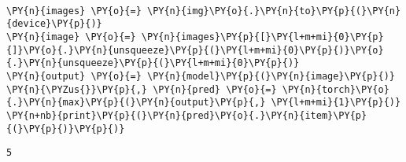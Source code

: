     \begin{center}
    \end{center}
    { \hspace*{\fill} \\}
    
    \begin{tcolorbox}[breakable, size=fbox, boxrule=1pt, pad at break*=1mm,colback=cellbackground, colframe=cellborder]
\begin{Verbatim}[commandchars=\\\{\}]
\PY{n}{images} \PY{o}{=} \PY{n}{img}\PY{o}{.}\PY{n}{to}\PY{p}{(}\PY{n}{device}\PY{p}{)}
\PY{n}{image} \PY{o}{=} \PY{n}{images}\PY{p}{[}\PY{l+m+mi}{0}\PY{p}{]}\PY{o}{.}\PY{n}{unsqueeze}\PY{p}{(}\PY{l+m+mi}{0}\PY{p}{)}\PY{o}{.}\PY{n}{unsqueeze}\PY{p}{(}\PY{l+m+mi}{0}\PY{p}{)}
\PY{n}{output} \PY{o}{=} \PY{n}{model}\PY{p}{(}\PY{n}{image}\PY{p}{)}
\PY{n}{\PYZus{}}\PY{p}{,} \PY{n}{pred} \PY{o}{=} \PY{n}{torch}\PY{o}{.}\PY{n}{max}\PY{p}{(}\PY{n}{output}\PY{p}{,} \PY{l+m+mi}{1}\PY{p}{)}
\PY{n+nb}{print}\PY{p}{(}\PY{n}{pred}\PY{o}{.}\PY{n}{item}\PY{p}{(}\PY{p}{)}\PY{p}{)}
\end{Verbatim}
\end{tcolorbox}

    \begin{Verbatim}[commandchars=\\\{\}]
5
    \end{Verbatim}


